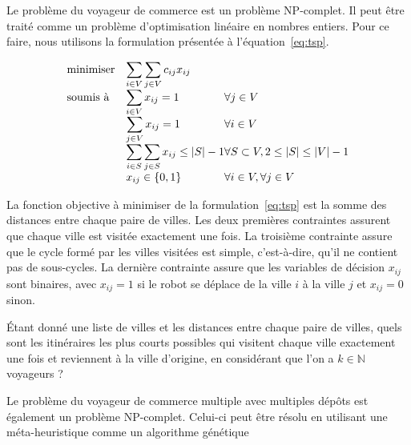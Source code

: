 \documentclass[francais,RandD]{rapportPFE}
\begin{document}
				Le problème du voyageur de commerce est un problème NP-complet.
				Il peut être traité comme un problème d'optimisation linéaire en nombres entiers.
				Pour ce faire, nous utilisons la formulation présentée à l'équation~\ref{eq:tsp}.

				\begin{equation}
					\label{eq:tsp}
					\begin{array}{ll@{}ll}
						\text{minimiser}  & \displaystyle\sum\limits_{i \in V} \sum\limits_{j \in V} c_{ij} x_{ij} \\
						\text{soumis à}   & \displaystyle\sum\limits_{i \in V} x_{ij} = 1 & \forall j \in V\\
						& \displaystyle\sum\limits_{j \in V} x_{ij} = 1 & \forall i \in V\\
						& \displaystyle\sum\limits_{i \in S} \sum\limits_{j \in S} x_{ij} \leq |S| - 1 & \forall S \subset V, 2 \leq |S| \leq |V| - 1\\
						& x_{ij} \in \{0, 1\} & \forall i \in V, \forall j \in V\\
					\end{array}
				\end{equation}

				La fonction objective à minimiser de la formulation~\ref{eq:tsp} est la somme des distances entre chaque paire de villes.
				Les deux premières contraintes assurent que chaque ville est visitée exactement une fois.
				La troisième contrainte assure que le cycle formé par les villes visitées est simple, c'est-à-dire, qu'il ne contient pas de sous-cycles.
				La dernière contrainte assure que les variables de décision $x_{ij}$ sont binaires, avec $x_{ij} = 1$ si le robot se déplace de la ville $i$ à la ville $j$ et $x_{ij} = 0$ sinon.

				\begin{Definition}
					\label{def:mtsp}
					Étant donné une liste de villes et les distances entre chaque paire de villes, quels sont les itinéraires les plus courts possibles qui visitent chaque ville exactement une fois et reviennent à la ville d'origine, en considérant que l'on a $k \in \mathbb{N}$ voyageurs ?
				\end{Definition}

				Le problème du voyageur de commerce multiple avec multiples dépôts est également un problème NP-complet.
				Celui-ci peut être résolu en utilisant une méta-heuristique comme un algorithme génétique~\cite{SinghMTSP, Kiraly2011}
\end{document}

